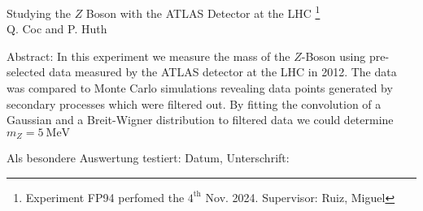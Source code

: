 \documentclass[11 pt]{article}
\begin{document}
\thispagestyle{empty}     %
\null\vspace{40mm}
\begin{center}
{%
\Large  
Studying the $Z$ Boson with the ATLAS Detector at the LHC \footnote{\noindent Experiment FP94 perfomed the $4^{\textrm{th}}$ Nov. 2024. Supervisor:	Ruiz, Miguel}
}\\[15mm]
Q. Coc and P. Huth

\vspace{25mm}

\parbox{0.9\textwidth}{
Abstract:    
\small 
In this experiment we measure the mass of the $Z$-Boson using pre-selected data measured by the ATLAS detector at the LHC in 2012. The data was compared to Monte Carlo simulations revealing data points generated by secondary processes which were filtered out. By fitting the convolution of a Gaussian and a Breit-Wigner distribution to filtered data we could determine $m_{Z} = \SI{5}{\mega\electronvolt}$
}
\end{center}

\vfill
Als besondere Auswertung testiert: Datum, Unterschrift:
\vspace{20mm}

\newpage  
\null\thispagestyle{empty} 
   

\newpage
\end{document}
